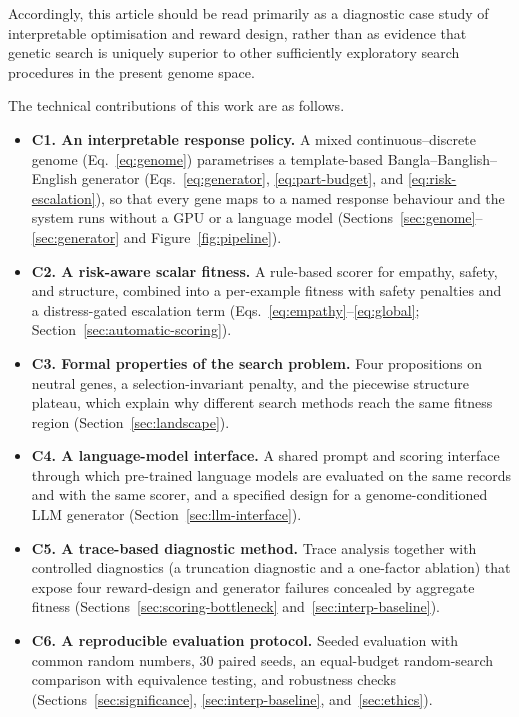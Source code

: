 \documentclass[mathematics,article,submit,xetex,moreauthors]{Definitions/mdpi}
\begin{document}
Accordingly, this article should be read primarily as a diagnostic case study of
interpretable optimisation and reward design, rather than as evidence that
genetic search is uniquely superior to other sufficiently exploratory search
procedures in the present genome space.


The technical contributions of this work are as follows.
\begin{itemize}
  \item \textbf{C1. An interpretable response policy.} A mixed
    continuous--discrete genome (Eq.~\eqref{eq:genome}) parametrises a
    template-based Bangla--Banglish--English generator
    (Eqs.~\eqref{eq:generator}, \eqref{eq:part-budget}, and
    \eqref{eq:risk-escalation}), so that every gene maps to a named response
    behaviour and the system runs without a GPU or a language model
    (Sections~\ref{sec:genome}--\ref{sec:generator} and
    Figure~\ref{fig:pipeline}).

  \item \textbf{C2. A risk-aware scalar fitness.} A rule-based scorer for
    empathy, safety, and structure, combined into a per-example fitness with
    safety penalties and a distress-gated escalation term
    (Eqs.~\eqref{eq:empathy}--\eqref{eq:global}; Section~\ref{sec:automatic-scoring}).

  \item \textbf{C3. Formal properties of the search problem.} Four
    propositions on neutral genes, a selection-invariant penalty, and the
    piecewise structure plateau, which explain why different search methods
    reach the same fitness region (Section~\ref{sec:landscape}).

  \item \textbf{C4. A language-model interface.} A shared prompt and scoring
    interface through which pre-trained language models are evaluated on the
    same records and with the same scorer, and a specified design for a
    genome-conditioned LLM generator (Section~\ref{sec:llm-interface}).

  \item \textbf{C5. A trace-based diagnostic method.} Trace analysis together
    with controlled diagnostics (a truncation diagnostic and a one-factor
    ablation) that expose four reward-design and generator failures concealed by
    aggregate fitness (Sections~\ref{sec:scoring-bottleneck}
    and~\ref{sec:interp-baseline}).

  \item \textbf{C6. A reproducible evaluation protocol.} Seeded evaluation with
    common random numbers, 30 paired seeds, an equal-budget random-search
    comparison with equivalence testing, and robustness checks
    (Sections~\ref{sec:significance}, \ref{sec:interp-baseline},
    and~\ref{sec:ethics}).
\end{itemize}
\end{document}

